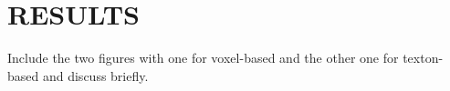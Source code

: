 \section{RESULTS}\label{sec:results}

Include the two figures with one for voxel-based and the other one for texton-based and discuss briefly.

